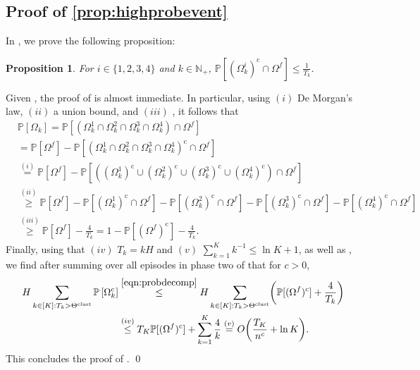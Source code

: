 \documentclass[11pt]{article}
\newcommand{\mbbP}{\mathbb{P}}
\newcommand{\mbbN}{\mathbb{N}}
\newcommand{\clust}{\textnormal{clust}}
\newcommand{\bkt}[1]{\left[#1\right]}
\newtheorem{proposition}[theorem]{Proposition}
\theoremstyle{definition}
\theoremstyle{definition}
\begin{document}
\subsection{Proof of \texorpdfstring{\cref{prop:highprobevent}}{the probability bound for the good event}}
\label{sec:proofstep1}

In , we prove the following proposition:
\begin{proposition}
	\label{prop:transition_probability_event_bd}
	For $i\in\{1,2,3,4\}$ and $k\in\mbbN_+$, $\mbbP[(\Omega_k^i)^{\mathrm{c}}\cap \Omega^f] \leq \frac{1}{T_k}$.
\end{proposition}
Given , the proof of  is almost immediate.
In particular, using $(i)$ De Morgan's law, $(ii)$ a union bound, and $(iii)$ , it follows that
\begin{equation}
	\label{eqn:probdecomp}
	\begin{split}
		 &
		\mbbP\bkt{\Omega_k}
		=
		\mbbP[
			( \Omega_k^{1}\cap\Omega_k^{2}\cap\Omega_k^3\cap\Omega_k^4)
			\cap\Omega^f
		]
		\\
		&
		=
		\mbbP[\Omega^f]
		-
		\mbbP[
			(\Omega_k^{1}
			\cap
			\Omega_k^{2}
			\cap
			\Omega_k^3
			\cap
			\Omega_k^4)^{\mathrm{c}}
			\cap\Omega^f
		]
		\\
		 &
		\overset{(i)}{=}
		\mbbP[\Omega^f]
		-
		\mbbP[
		(
		(\Omega_k^{1})^{\mathrm{c}}
		\cup
		(\Omega_k^{2})^{\mathrm{c}}
		\cup
		(\Omega_k^3)^{\mathrm{c}}
		\cup
		(\Omega_k^4)^{\mathrm{c}}
		)
		\cap
		\Omega^f
		]
		\\
		 &
		\overset{(ii)}{\geq}
		\mbbP[\Omega^f]
		-
		\mbbP[
			( \Omega_k^{1})^{\mathrm{c}} \cap \Omega^f
		]
		-
		\mbbP[(\Omega_k^{2})^{\mathrm{c}}\cap \Omega^f]
		-
		\mbbP[( \Omega_k^{3})^{\mathrm{c}}\cap \Omega^f]
		-
		\mbbP[( \Omega_k^{4})^{\mathrm{c}}\cap \Omega^f]
		\\
		 &
		\overset{(iii)}{\geq}
		\mbbP[\Omega^f]
		-
		\frac{4}{T_k}
		=
		1
		-
		\mbbP[(\Omega^f)^{\mathrm{c}}]
		-
		\frac{4}{T_k}
		.
	\end{split}
\end{equation}
Finally, using that $(iv)$ $T_k = kH$ and $(v)$ $\sum_{k=1}^Kk^{-1}\leq \ln K +1$, as well as , we find after summing over all episodes in phase two of  that for $c>0$,
\begin{equation}
	\begin{split}
		H\sum_{k\in[K]:T_k>\Theta^{\clust}}\mbbP\bkt{\Omega_k^c}
		 &
		\overset{\eqref{eqn:probdecomp}}{\leq}
		H\sum_{k\in[K]:T_k>\Theta^{\clust}}\biggl(
		\mbbP[(\Omega^f)^{\mathrm{c}}]
		+
		\frac{4}{T_k}
		\biggr)
		\\
		 &
		\overset{(iv)}{\leq}
		T_K\mbbP[(\Omega^f)^{\mathrm{c}}]
		+
		\sum_{k=1}^K
		\frac{4}{k}
		\overset{(v)}{=}
		O\biggl(\frac{T_K}{n^c} + \ln K \biggr)
		.
	\end{split}
\end{equation}
This concludes the proof of .
\qed
\end{document}
